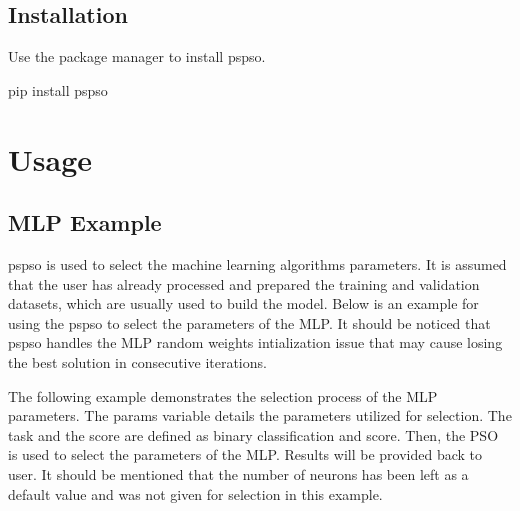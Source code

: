 \documentclass[letterpaper,10pt,english]{sphinxmanual}
\begin{document}
\section{Installation}
\label{\detokenize{index:installation}}
Use the package manager  to
install pspso.

\begin{sphinxVerbatim}[commandchars=\\\{\}]
pip install pspso
\end{sphinxVerbatim}


\chapter{Usage}
\label{\detokenize{index:usage}}

\section{MLP Example}
\label{\detokenize{index:mlp-example}}
pspso is used to select the machine learning algorithms parameters. It
is assumed that the user has already processed and prepared the training
and validation datasets, which are usually used to build the model.
Below is an example for using the pspso to select
the parameters of the MLP. It should be noticed that pspso handles the
MLP random weights intialization issue that may cause losing the best
solution in consecutive iterations.

The following example demonstrates the selection process of the MLP parameters.
The params variable details the parameters utilized for selection.
The task and the score are defined as binary classification and score.
Then, the PSO is used to select the parameters of the MLP.
Results will be provided back to user.
It should be mentioned that the number of neurons has been left as a default value and was not given for selection in this example.
\end{document}
